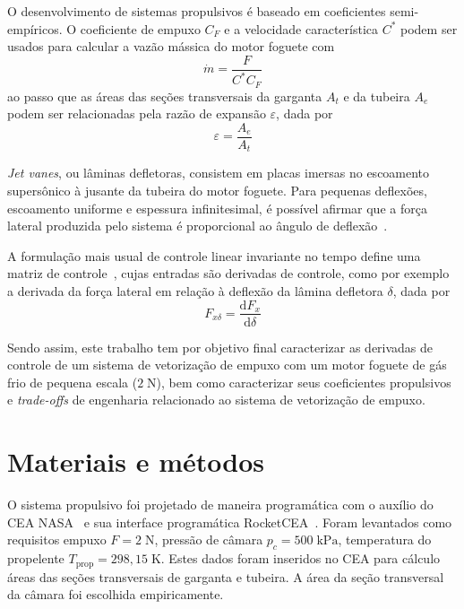 \documentclass[
	article,			%
	10pt,				%
	oneside,			%
	a4paper,			%
  twocolumn,			%
	english,			%
	brazil,				%
	sumario=tradicional,
	]{abntex2}
\begin{document}
O desenvolvimento de sistemas propulsivos é baseado em coeficientes semi-empíricos. O coeficiente de empuxo \(C_F\) e a velocidade característica \(C^*\) podem ser usados para calcular a vazão mássica do motor foguete com~\cite{Sutton}
\begin{equation}
  \label{eq:mass_flow}
  \dot{m} = \frac{F}{C^* C_F}
\end{equation}
ao passo que as áreas das seções transversais da garganta \(A_t\) e da tubeira \(A_e\) podem ser relacionadas pela razão de expansão \(\varepsilon \), dada por
\begin{equation}
  \varepsilon = \frac{A_e}{A_t}\label{eq:exp_ratio}
\end{equation} 

\textit{Jet vanes}, ou lâminas defletoras, consistem em placas imersas no escoamento supersônico à jusante da tubeira do motor foguete. Para pequenas deflexões, escoamento uniforme e espessura infinitesimal, é possível afirmar que a força lateral produzida pelo sistema é proporcional ao ângulo de deflexão~\cite{anderson}. 

A formulação mais usual de controle linear invariante no tempo define uma matriz de controle~\cite{fbsys}, cujas entradas são derivadas de controle, como por exemplo a derivada da força lateral em relação à deflexão da lâmina defletora \(\delta \), dada por
\begin{equation}
  F_{x\delta} = \frac{\mathrm{d} F_x}{\mathrm{d} \delta}\label{eq:control_derivative}
\end{equation}

Sendo assim, este trabalho tem por objetivo final caracterizar as derivadas de controle de um sistema de vetorização de empuxo com um motor foguete de gás frio de pequena escala (\(2\;\mathrm{N}\)), bem como caracterizar seus coeficientes propulsivos e \textit{trade-offs} de engenharia relacionado ao sistema de vetorização de empuxo.

\section{Materiais e métodos}

O sistema propulsivo foi projetado de maneira programática com o auxílio do CEA NASA~\cite{ceanasa} e sua interface programática RocketCEA~\cite{rocketcea}. Foram levantados como requisitos empuxo \(F = 2\;\mathrm{N}\), pressão de câmara \(p_c = 500\;\mathrm{kPa}\), temperatura do propelente \(T_{\mathrm{prop}} = 298,15\;\mathrm{K}\). Estes dados foram inseridos no CEA para cálculo áreas das seções transversais de garganta e tubeira. A área da seção transversal da câmara foi escolhida empiricamente.
\end{document}
